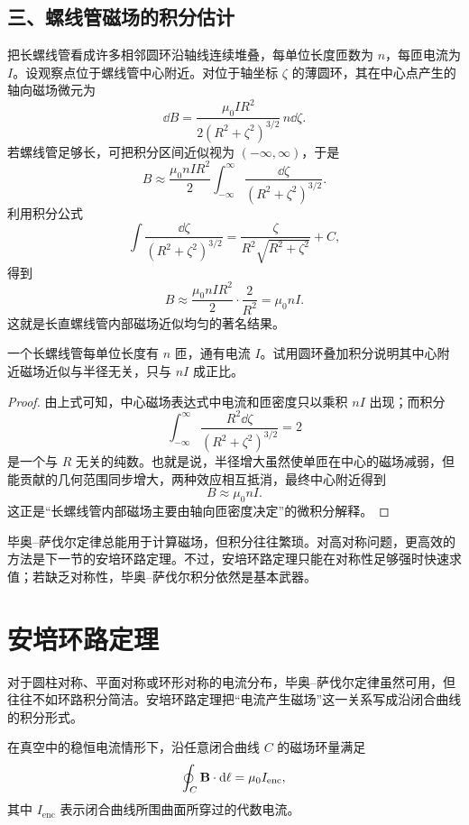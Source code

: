 \subsection*{三、螺线管磁场的积分估计}

把长螺线管看成许多相邻圆环沿轴线连续堆叠，每单位长度匝数为 $n$，每匝电流为 $I$。设观察点位于螺线管中心附近。对位于轴坐标 $\zeta$ 的薄圆环，其在中心点产生的轴向磁场微元为
\[
  \dd B=\frac{\mu_0 I R^2}{2(R^2+\zeta^2)^{3/2}}\,n\dd\zeta.
\]
若螺线管足够长，可把积分区间近似视为 $(-\infty,\infty)$，于是
\[
  B\approx \frac{\mu_0 n I R^2}{2}\int_{-\infty}^{\infty}\frac{\dd\zeta}{(R^2+\zeta^2)^{3/2}}.
\]
利用积分公式
\[
  \int \frac{\dd\zeta}{(R^2+\zeta^2)^{3/2}}=\frac{\zeta}{R^2\sqrt{R^2+\zeta^2}}+C,
\]
得到
\[
  B\approx \frac{\mu_0 n I R^2}{2}\cdot \frac{2}{R^2}=\mu_0 n I.
\]
这就是长直螺线管内部磁场近似均匀的著名结果。

\begin{example}
一个长螺线管每单位长度有 $n$ 匝，通有电流 $I$。试用圆环叠加积分说明其中心附近磁场近似与半径无关，只与 $nI$ 成正比。
\end{example}

\begin{proof}
由上式可知，中心磁场表达式中电流和匝密度只以乘积 $nI$ 出现；而积分
\[
  \int_{-\infty}^{\infty}\frac{R^2\dd\zeta}{(R^2+\zeta^2)^{3/2}}=2
\]
是一个与 $R$ 无关的纯数。也就是说，半径增大虽然使单匝在中心的磁场减弱，但能贡献的几何范围同步增大，两种效应相互抵消，最终中心附近得到
\[
  B\approx \mu_0 nI.
\]
这正是“长螺线管内部磁场主要由轴向匝密度决定”的微积分解释。
\end{proof}

\begin{remark}
毕奥--萨伐尔定律总能用于计算磁场，但积分往往繁琐。对高对称问题，更高效的方法是下一节的安培环路定理。不过，安培环路定理只能在对称性足够强时快速求值；若缺乏对称性，毕奥--萨伐尔积分依然是基本武器。
\end{remark}

\section{安培环路定理}

对于圆柱对称、平面对称或环形对称的电流分布，毕奥--萨伐尔定律虽然可用，但往往不如环路积分简洁。安培环路定理把“电流产生磁场”这一关系写成沿闭合曲线的积分形式。

\begin{law}[安培环路定理]
在真空中的稳恒电流情形下，沿任意闭合曲线 $C$ 的磁场环量满足
\[
  \oint_C \vb{B}\cdot\dd\vb{\ell}=\mu_0 I_{\mathrm{enc}},
\]
其中 $I_{\mathrm{enc}}$ 表示闭合曲线所围曲面所穿过的代数电流。
\end{law}

